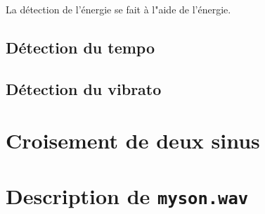 \begin{frame}
    La détection de l'énergie se fait à l"aide de l'énergie.
\end{frame}

\subsection{Détection du tempo}

\begin{frame}
    
\end{frame}

\subsection{Détection du vibrato}

\begin{frame}
    
\end{frame}

\section{Croisement de deux sinus}

\section{Description de \texttt{myson.wav}}